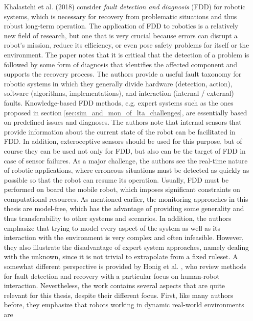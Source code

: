 \documentclass[english, master, utf8]{base/thesis_KBS}
\begin{document}
Khalastchi et al. (2018) consider \textit{fault detection and diagnosis} (FDD) for robotic systems, which is necessary for recovery from problematic situations and thus
robust long-term operation. \cite{Khalastchi:2018} The application of FDD to robotics is a relatively new field of research, but one that is very crucial
because errors can disrupt a robot's mission, reduce its efficiency, or even pose safety problems for itself or the environment. \cite{Khalastchi:2018} The paper notes that it is
critical that the detection of a problem is followed by some form of diagnosis that identifies the affected component and supports the recovery process. The authors provide a useful
fault taxonomy for robotic systems in which they generally divide hardware (detection, action), software (algorithms, implementations), and interaction (internal / external) faults.
Knowledge-based FDD methods, e.g. expert systems such as the ones proposed in section \ref{sec:sim_and_mon_of_lta_challenges}, are essentially based on predefined issues and
diagnoses. \cite{Khalastchi:2018} The authors note that internal sensors that provide information about the current state of the robot can be facilitated in FDD. In addition,
exteroceptive sensors should be used for this purpose, but of course they can be used not only for FDD, but also can be the target of FDD in case of sensor failures. \cite{Khalastchi:2018}
As a major challenge, the authors see the real-time nature of robotic applications, where erroneous situations must be detected as quickly as possible so that the robot can resume
its operation. Usually, FDD must be performed on board the mobile robot, which imposes significant constraints on computational resources. \cite{Khalastchi:2018} As mentioned earlier,
the monitoring approaches in this thesis are model-free, which has the advantage of providing some generality and thus transferability to other systems and scenarios. \cite{Khalastchi:2018} 
In addition, the authors emphasize that trying to model every aspect of the system as well as its interaction with the environment is very complex and often infeasible.
However, they also illustrate the disadvantage of expert system approaches, namely dealing with the unknown, since it is not trivial to extrapolate from a fixed ruleset.\newline
A somewhat different perspective is provided by Honig et al. \cite{Honig:2018}, who review methods for fault detection and recovery with a particular focus on human-robot interaction. Nevertheless, the work contains several aspects
that are quite relevant for this thesis, despite their different focus. First, like many authors before, they emphasize that robots working in dynamic real-world environments are
\end{document}
